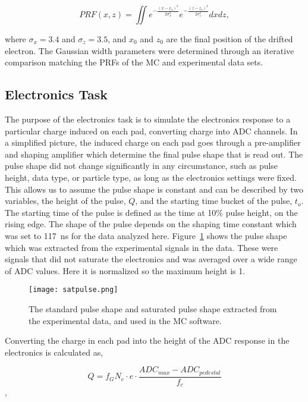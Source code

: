 \begin{equation}
PRF(x,z) = \iint e^{-\frac{(x-x_o)^2}{2\sigma_x^2}} e^{-\frac{(z-z_o)^2}{2\sigma_z^2}}dxdz,
\end{equation}

where $\sigma_x = 3.4$ and $\sigma_z = 3.5$, and $x_0$ and $z_0$ are the final position of the drifted electron. The Gaussian width parameters were determined through an iterative comparison matching the PRFs of the MC and experimental data sets. 


\subsection{Electronics Task}

The purpose of the electronics task is to simulate the electronics response to a particular charge induced on each pad, converting charge into ADC channels. In a simplified picture, the induced charge on each pad goes through a pre-amplifier and shaping amplifier which determine the final pulse shape that is read out. The pulse shape did not change significantly in any circumstance, such as pulse height, data type, or particle type, as long as the electronics settings were fixed. This allows us to assume the pulse shape is constant and can be described by two variables, the height of the pulse, $Q$, and the starting time bucket of the pulse, $t_o$. The starting time of the pulse is defined as the time at 10\% pulse height, on the rising edge. The shape of the pulse depends on the shaping time constant which was set to \SI{117}{\nano\second} for the data analyzed here. Figure~\ref{fig:pulseshape} shows the pulse shape which was extracted from the experimental signals in the data. These were signals that did not saturate the electronics and was averaged over a wide range of ADC values. Here it is normalized so the maximum height is 1. 



\begin{figure}[!htb]
    \centering       
    \texttt{[image: satpulse.png]} 
    \caption{The standard pulse shape and saturated pulse shape extracted from the experimental data, and used in the MC software.}
    \label{fig:pulseshape}
\end{figure}


Converting the charge in each pad into the height of the ADC response in the electronics is calculated as, 

\begin{equation}
Q = f_G  N_{e}  \cdot e \cdot\frac{ADC_{max} - ADC_{pedestal}}{f_c}
\label{eq:etoADC}
\end{equation},

